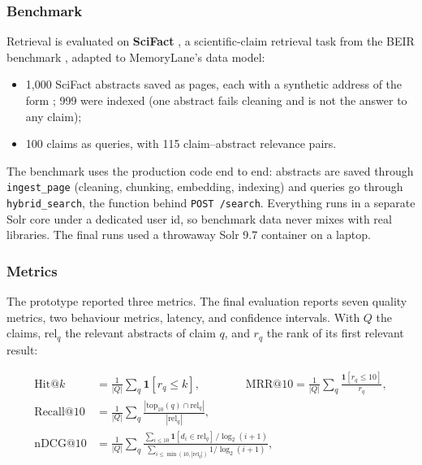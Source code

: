 \subsubsection{Benchmark}

Retrieval is evaluated on \textbf{SciFact} \cite{wadden2020scifact}, a
scientific-claim retrieval task from the BEIR benchmark
\cite{thakur2021beir}, adapted to MemoryLane's data model:

\begin{itemize}
  \item 1{,}000 SciFact abstracts saved as pages, each with a synthetic
  address of the form ; 999 were indexed
  (one abstract fails cleaning and is not the answer to any claim);
  \item 100 claims as queries, with 115 claim--abstract relevance pairs.
\end{itemize}

The benchmark uses the production code end to end: abstracts are saved
through \texttt{ingest\_page} (cleaning, chunking, embedding, indexing) and
queries go through \texttt{hybrid\_search}, the function behind
\texttt{POST /search}. Everything runs in a separate Solr core under a
dedicated user id, so benchmark data never mixes with real libraries. The
final runs used a throwaway Solr 9.7 container on a laptop.

\subsubsection{Metrics}

The prototype reported three metrics. The final evaluation reports seven
quality metrics, two behaviour metrics, latency, and confidence intervals.
With $Q$ the claims, $\text{rel}_q$ the relevant abstracts of claim $q$, and
$r_q$ the rank of its first relevant result:

\begin{align*}
\text{Hit@}k &= \frac{1}{|Q|}\sum_{q} \mathbf{1}[r_q \leq k],
\qquad\qquad
\text{MRR@10} = \frac{1}{|Q|}\sum_{q} \frac{\mathbf{1}[r_q \le 10]}{r_q}, \\[2mm]
\text{Recall@10} &= \frac{1}{|Q|}\sum_{q} \frac{|\text{top}_{10}(q) \cap \text{rel}_q|}{|\text{rel}_q|}, \\[2mm]
\text{nDCG@10} &= \frac{1}{|Q|}\sum_{q}\frac{\sum_{i \le 10} \mathbf{1}[d_i \in \text{rel}_q]\,/\log_2(i+1)}{\sum_{i \le \min(10,|\text{rel}_q|)} 1/\log_2(i+1)},
\end{align*}

